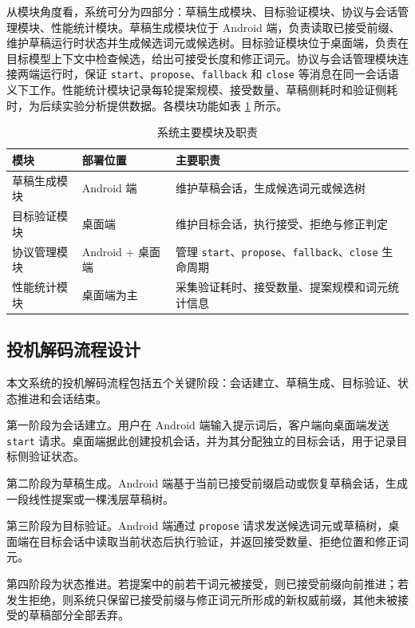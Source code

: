 从模块角度看，系统可分为四部分：草稿生成模块、目标验证模块、协议与会话管理模块、性能统计模块。草稿生成模块位于 Android 端，负责读取已接受前缀、维护草稿运行时状态并生成候选词元或候选树。目标验证模块位于桌面端，负责在目标模型上下文中检查候选，给出可接受长度和修正词元。协议与会话管理模块连接两端运行时，保证 \texttt{start}、\texttt{propose}、\texttt{fallback} 和 \texttt{close} 等消息在同一会话语义下工作。性能统计模块记录每轮提案规模、接受数量、草稿侧耗时和验证侧耗时，为后续实验分析提供数据。各模块功能如表 \ref{tab:modules} 所示。
\begin{table}[htbp]
  \centering
  \caption{系统主要模块及职责}
  \label{tab:modules}
  \small
  \begin{tabularx}{0.98\textwidth}{p{24mm}p{22mm}X}
    \toprule
    模块 & 部署位置 & 主要职责 \\
    \midrule
    草稿生成模块 & Android 端 & 维护草稿会话，生成候选词元或候选树 \\
    目标验证模块 & 桌面端 & 维护目标会话，执行接受、拒绝与修正判定 \\
    协议管理模块 & Android + 桌面端 & 管理 \texttt{start}、\texttt{propose}、\texttt{fallback}、\texttt{close} 生命周期 \\
    性能统计模块 & 桌面端为主 & 采集验证耗时、接受数量、提案规模和词元统计信息 \\
    \bottomrule
  \end{tabularx}
\end{table}

\subsection{投机解码流程设计}

本文系统的投机解码流程包括五个关键阶段：会话建立、草稿生成、目标验证、状态推进和会话结束。

第一阶段为会话建立。用户在 Android 端输入提示词后，客户端向桌面端发送 \texttt{start} 请求。桌面端据此创建投机会话，并为其分配独立的目标会话，用于记录目标侧验证状态。

第二阶段为草稿生成。Android 端基于当前已接受前缀启动或恢复草稿会话，生成一段线性提案或一棵浅层草稿树。

第三阶段为目标验证。Android 端通过 \texttt{propose} 请求发送候选词元或草稿树，桌面端在目标会话中读取当前状态后执行验证，并返回接受数量、拒绝位置和修正词元。

第四阶段为状态推进。若提案中的前若干词元被接受，则已接受前缀向前推进；若发生拒绝，则系统只保留已接受前缀与修正词元所形成的新权威前缀，其他未被接受的草稿部分全部丢弃。

